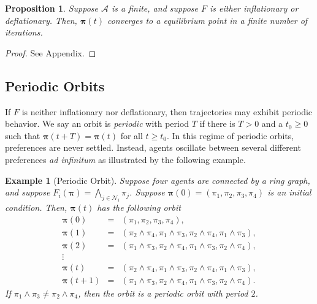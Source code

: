 \documentclass[conference]{ieeeconf}
\newcommand{\N}{\mathcal{N}}
\newcommand{\A}{\mathcal{A}}
\newcommand{\profile}{\boldsymbol{\pi}}
\newcommand{\meet}{\wedge}
\newcommand{\bigmeet}{\bigwedge}
\renewcommand{\geq}{\geqslant}
\newtheorem{proposition}{Proposition}
\newtheorem{example}{Example}
\begin{document}
\begin{proposition} \label{prop:inflationary}
     Suppose $\A$ is a finite, and suppose $F$ is either inflationary or deflationary. Then, $\profile(t)$ converges to a equilibrium point in a finite number of iterations.
\end{proposition}
\begin{proof}
See Appendix.
\end{proof}

\textcolor{red}{}

\subsection{Periodic Orbits}
If $F$ is neither inflationary nor deflationary, then trajectories may exhibit periodic behavior. We say an orbit is \emph{periodic} with period $T$ if there is $T>0$ and a $t_0 \geq 0$ such that $\profile(t+T) = \profile(t)$ for all $t \geq t_0$. In this regime of periodic orbits, preferences are never settled. Instead, agents oscillate between several different preferences \emph{ad infinitum} as illustrated by the following example.

\begin{example}[Periodic Orbit]
    Suppose four agents are connected by a ring graph, and suppose $F_i(\profile) = \bigmeet_{j \in \N_i} \pi_j$. Suppose $\profile(0) = (\pi_1,\pi_2,\pi_3,\pi_4)$ is an initial condition. Then, $\profile(t)$ has the following orbit
    \begin{align*}
        \profile(0) &=& \left( \pi_1,\pi_2,\pi_3,\pi_4 \right), \\
        \profile(1) &=& \left( \pi_2 \meet \pi_4, \pi_1 \meet \pi_3, \pi_2 \meet \pi_4, \pi_1 \meet \pi_3 \right), \\
        \profile(2) &=& \left( \pi_1 \meet \pi_3, \pi_2 \meet \pi_4, \pi_1 \meet \pi_3, \pi_2 \meet \pi_4 \right), \\
        \vdots &&  \\
        \profile(t) &=& \left( \pi_2 \meet \pi_4, \pi_1 \meet \pi_3, \pi_2 \meet \pi_4, \pi_1 \meet \pi_3 \right), \\
        \profile(t+1) &=& \left( \pi_1 \meet \pi_3, \pi_2 \meet \pi_4, \pi_1 \meet \pi_3, \pi_2 \meet \pi_4 \right).
    \end{align*}
    If $\pi_1 \meet \pi_3 \neq \pi_2 \meet \pi_4$, then the orbit is a periodic orbit with period $2$.
\end{example}
\end{document}
